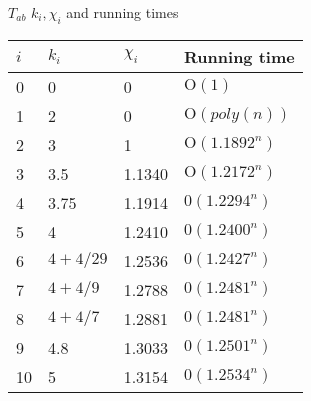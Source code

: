 \documentclass{sigchi}
\begin{document}
\begin{center}
	$T_{a b}$
	$k_{i}, \chi_{i}$ and running times \\
	\begin{tabular}{llll}
		\hline$i$ & $k_{i}$ & $\chi_{i}$ & Running time \\
		\hline 0 & 0 & 0 & $\mathrm{O}(1)$ \\
		1 & 2 & 0 & $\mathrm{O}(p o l y(n))$ \\
		2 & 3 & 1& $\mathrm{O}\left(1.1892^{n}\right)$ \\
		3 & 3.5 &1.1340& $\mathrm{O}\left(1.2172^{n}\right)$ \\
		4 & 3.75&1.1914 & $0\left(1.2294^{n}\right)$ \\
		5 & 4 & 1.2410&$0\left(1.2400^{n}\right)$ \\
		6 & $4+4 / 29$ & 1.2536& $0\left(1.2427^{n}\right)$ \\
		7 & $4+4 / 9$ &1.2788& $0\left(1.2481^{n}\right)$ \\
		8 & $4+4 / 7$ &1.2881& $0\left(1.2481^{n}\right)$ \\
		9 & 4.8 &1.3033& $0\left(1.2501^{n}\right)$ \\
		10 & 5 & 1.3154& $0\left(1.2534^{n}\right)$ \\
		\hline
	\end{tabular}\\
	
\end{center}
\end{document}
